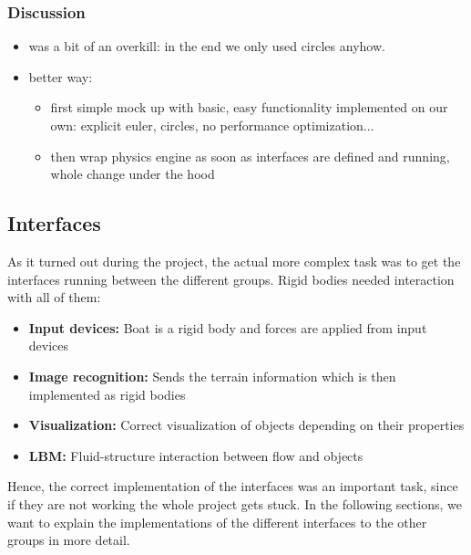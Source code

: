 \subsubsection{Discussion}
\begin{itemize}
\item was a bit of an overkill: in the end we only used circles anyhow.
\item better way: 
\begin{itemize}
\item first simple mock up with basic, easy functionality implemented on our own: explicit euler, circles, no performance optimization...
\item then wrap physics engine as soon as interfaces are defined and running, whole change under the hood
\end{itemize}
\end{itemize}

\subsection{Interfaces}
As it turned out during the project, the actual more complex task was to get the interfaces running between the different groups. Rigid bodies needed interaction with all of them:
\begin{itemize}
\item \textbf{Input devices:} Boat is a rigid body and forces are applied from input devices
\item \textbf{Image recognition:} Sends the terrain information which is then implemented as rigid bodies
\item \textbf{Visualization:} Correct visualization of objects depending on their properties
\item \textbf{LBM:} Fluid-structure interaction between flow and objects
\end{itemize}
Hence, the correct implementation of the interfaces was an important task, since if they are not working the whole project gets stuck. In the following sections, we want to explain the implementations of the different interfaces to the other groups in more detail.
